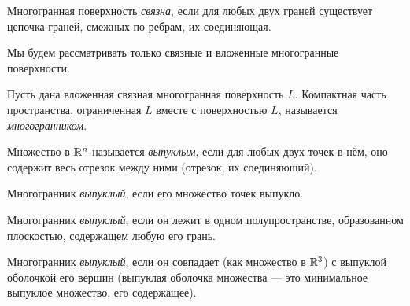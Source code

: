 \begin{definition}
    Многогранная поверхность \textit{связна}, если для любых двух граней существует цепочка граней, смежных по ребрам, их соединяющая.
\end{definition}

\begin{remark}
    Мы будем рассматривать только связные и вложенные многогранные поверхности.
\end{remark}

\begin{definition}
    Пусть дана вложенная связная многогранная поверхность $L$. Компактная часть пространства, ограниченная $L$ вместе с поверхностью $L$, называется \textit{многогранником}.
\end{definition}

\begin{definition}
    Множество в $\mathbb{R}^n$ называется \textit{выпуклым}, если для любых двух точек в нём, оно содержит весь отрезок между ними (отрезок, их соединяющий).
\end{definition}

\begin{definition}[1]
    Многогранник \textit{выпуклый}, если его множество точек выпукло.
\end{definition}

\begin{definition}[2]
    Многогранник \textit{выпуклый}, если он лежит в одном полупространстве, образованном плоскостью, содержащем любую его грань.
\end{definition}

\begin{definition}[3]
    Многогранник \textit{выпуклый}, если он совпадает (как множество в $\mathbb{R}^3$) с выпуклой оболочкой его вершин (выпуклая оболочка множества — это минимальное выпуклое множество, его содержащее).
\end{definition}

